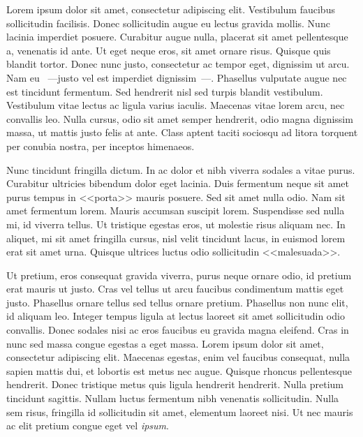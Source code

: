 Lorem ipsum dolor sit amet, consectetur adipiscing elit. Vestibulum faucibus
sollicitudin facilisis. Donec sollicitudin augue eu lectus gravida mollis.
Nunc lacinia imperdiet posuere. Curabitur augue nulla, placerat sit amet
pellentesque a, venenatis id ante. Ut eget neque eros, sit amet ornare risus.
Quisque quis blandit tortor. Donec nunc justo, consectetur ac tempor eget,
dignissim ut arcu. Nam eu ~---justo vel est imperdiet dignissim~---. Phasellus
vulputate augue nec est tincidunt fermentum. Sed hendrerit nisl sed turpis
blandit vestibulum. Vestibulum vitae lectus ac ligula varius iaculis. Maecenas
vitae lorem arcu, nec convallis leo. Nulla cursus, odio sit amet semper
hendrerit, odio magna dignissim massa, ut mattis justo felis at ante. Class
aptent taciti sociosqu ad litora torquent per conubia nostra, per inceptos
himenaeos.

Nunc tincidunt fringilla dictum. In ac dolor et nibh viverra sodales a vitae
purus. Curabitur ultricies bibendum dolor eget lacinia. Duis fermentum neque
sit amet purus tempus in <<porta>> mauris posuere. Sed sit amet nulla odio.
Nam sit amet fermentum lorem. Mauris accumsan suscipit lorem. Suspendisse sed
nulla mi, id viverra tellus. Ut tristique egestas eros, ut molestie risus
aliquam nec. In aliquet, mi sit amet fringilla cursus, nisl velit tincidunt
lacus, in euismod lorem erat sit amet urna. Quisque ultrices luctus odio
sollicitudin <<malesuada>>.

Ut pretium, eros consequat gravida viverra, purus neque ornare odio, id
pretium erat mauris ut justo. Cras vel tellus ut arcu faucibus condimentum
mattis eget justo. Phasellus ornare tellus sed tellus ornare pretium.
Phasellus non nunc elit, id aliquam leo. Integer tempus ligula at lectus
laoreet sit amet sollicitudin odio convallis. Donec sodales nisi ac eros
faucibus eu gravida magna eleifend. Cras in nunc sed massa congue egestas a
eget massa. Lorem ipsum dolor sit amet, consectetur adipiscing elit. Maecenas
egestas, enim vel faucibus consequat, nulla sapien mattis dui, et lobortis est
metus nec augue. Quisque rhoncus pellentesque hendrerit. Donec tristique metus
quis ligula hendrerit hendrerit. Nulla pretium tincidunt sagittis. Nullam
luctus fermentum nibh venenatis sollicitudin. Nulla sem risus, fringilla id
sollicitudin sit amet, elementum laoreet nisi. Ut nec mauris ac elit pretium
congue eget vel \emph{ipsum}.
